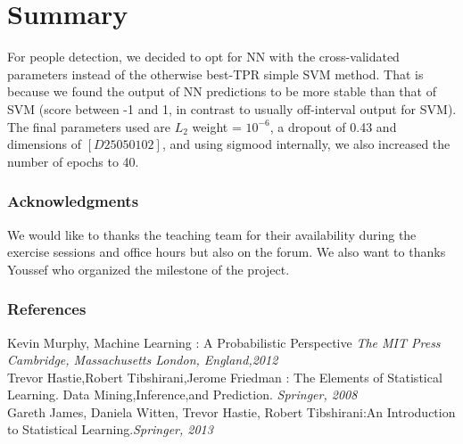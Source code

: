 \documentclass{article} %
\begin{document}
\section{Summary}
For people detection, we decided to opt for NN with the cross-validated parameters instead of the otherwise best-TPR simple SVM method. That is because we found the output of NN predictions to be more stable than that of SVM (score between -1 and 1, in contrast to usually off-interval output for SVM). The final parameters used are $L_2$ weight = $10^{-6}$, a dropout of 0.43 and dimensions of $[D 250 50 10 2]$, and using sigmood internally, we also increased the number of epochs to 40.
\subsubsection*{Acknowledgments}
We would like to thanks the teaching team for their availability during the exercise sessions and office hours but also on the forum. We also want to thanks Youssef who organized the milestone of the project.
\subsubsection*{References}
Kevin Murphy, Machine Learning : A Probabilistic Perspective {\em The MIT Press
Cambridge, Massachusetts
London, England,2012}\\
Trevor Hastie,Robert Tibshirani,Jerome Friedman : The Elements of
Statistical Learning. Data Mining,Inference,and Prediction. {\em Springer, 2008}\\
Gareth James,
Daniela Witten,
Trevor Hastie,
Robert Tibshirani:An Introduction to Statistical Learning.{\em Springer, 2013}
\end{document}
